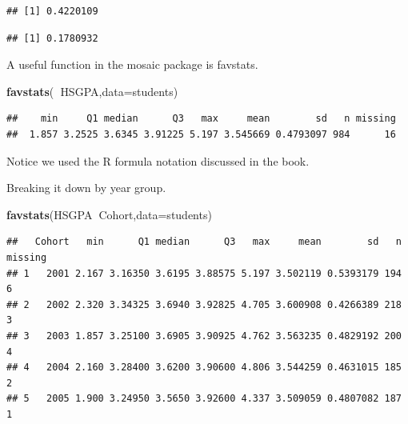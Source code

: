 \documentclass[]{book}
\newenvironment{Shaded}{\begin{snugshade}}{\end{snugshade}}
\newcommand{\KeywordTok}[1]{\textcolor[rgb]{0.13,0.29,0.53}{\textbf{#1}}}
\newcommand{\DataTypeTok}[1]{\textcolor[rgb]{0.13,0.29,0.53}{#1}}
\newcommand{\OperatorTok}[1]{\textcolor[rgb]{0.81,0.36,0.00}{\textbf{#1}}}
\newcommand{\NormalTok}[1]{#1}
\theoremstyle{definition}
\theoremstyle{definition}
\theoremstyle{definition}
\theoremstyle{remark}
\begin{document}
\begin{Shaded}
\end{Shaded}

\begin{verbatim}
## [1] 0.4220109
\end{verbatim}

\begin{Shaded}
\end{Shaded}

\begin{verbatim}
## [1] 0.1780932
\end{verbatim}

A useful function in the mosaic package is favstats.

\begin{Shaded}
\begin{Highlighting}[]
\KeywordTok{favstats}\NormalTok{(}\OperatorTok{~}\NormalTok{HSGPA,}\DataTypeTok{data=}\NormalTok{students)}
\end{Highlighting}
\end{Shaded}

\begin{verbatim}
##    min     Q1 median      Q3   max     mean        sd   n missing
##  1.857 3.2525 3.6345 3.91225 5.197 3.545669 0.4793097 984      16
\end{verbatim}

Notice we used the R formula notation discussed in the book.

Breaking it down by year group.

\begin{Shaded}
\begin{Highlighting}[]
\KeywordTok{favstats}\NormalTok{(HSGPA}\OperatorTok{~}\NormalTok{Cohort,}\DataTypeTok{data=}\NormalTok{students)}
\end{Highlighting}
\end{Shaded}

\begin{verbatim}
##   Cohort   min      Q1 median      Q3   max     mean        sd   n missing
## 1   2001 2.167 3.16350 3.6195 3.88575 5.197 3.502119 0.5393179 194       6
## 2   2002 2.320 3.34325 3.6940 3.92825 4.705 3.600908 0.4266389 218       3
## 3   2003 1.857 3.25100 3.6905 3.90925 4.762 3.563235 0.4829192 200       4
## 4   2004 2.160 3.28400 3.6200 3.90600 4.806 3.544259 0.4631015 185       2
## 5   2005 1.900 3.24950 3.5650 3.92600 4.337 3.509059 0.4807082 187       1
\end{verbatim}
\end{document}
